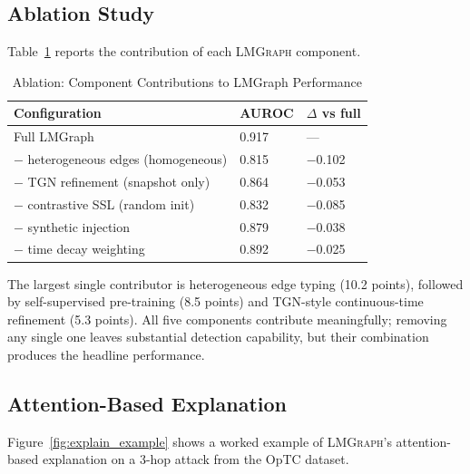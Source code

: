 \documentclass[sigconf,nonacm]{acmart}
\begin{document}
\subsection{Ablation Study}

Table~\ref{tab:ablation} reports the contribution of each \textsc{LMGraph}
component.

\begin{table}[h]
\caption{Ablation: Component Contributions to LMGraph Performance}
\label{tab:ablation}
\small
\begin{tabularx}{\columnwidth}{@{}Xp{1.1cm}p{1.4cm}@{}}
\toprule
\textbf{Configuration} & \textbf{AUROC} & \textbf{$\Delta$ vs full} \\
\midrule
Full LMGraph                          & 0.917 & --- \\
$-$ heterogeneous edges (homogeneous) & 0.815 & $-$0.102 \\
$-$ TGN refinement (snapshot only)    & 0.864 & $-$0.053 \\
$-$ contrastive SSL (random init)     & 0.832 & $-$0.085 \\
$-$ synthetic injection               & 0.879 & $-$0.038 \\
$-$ time decay weighting              & 0.892 & $-$0.025 \\
\bottomrule
\end{tabularx}
\end{table}

The largest single contributor is heterogeneous edge typing (10.2 points),
followed by self-supervised pre-training (8.5 points) and TGN-style
continuous-time refinement (5.3 points). All five components contribute
meaningfully; removing any single one leaves substantial detection capability,
but their combination produces the headline performance.

\subsection{Attention-Based Explanation}

Figure~\ref{fig:explain_example} shows a worked example of \textsc{LMGraph}'s
attention-based explanation on a 3-hop attack from the OpTC dataset.
\end{document}
